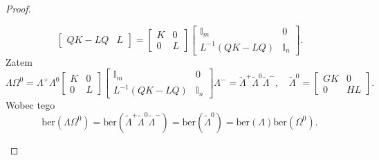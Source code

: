 \documentclass[11pt,a4paper]{report}
\theoremstyle{definition}
\newcommand{\ber}{\mathrm{ber}}
\newcommand{\I}{\mathbb{I}}
\begin{document}
\begin{proof}
\begin{enumerate}[1)]
$$\begin{bmatrix}
		QK - LQ & L 
		\end{bmatrix} = \begin{bmatrix}
		K & 0 \\
		0 & L 
		\end{bmatrix} \begin{bmatrix}
		\I_m & 0 \\
		L^{-1}(QK - LQ) & \I_n 
		\end{bmatrix}\!\!.$$
		Zatem 
		\begin{equation*}
			\Lambda \Omega^0 = \Lambda^+ \Lambda^0 \begin{bmatrix}
			K & 0 \\
			0 & L 
			\end{bmatrix} \begin{bmatrix}
			\I_m & 0 \\
			L^{-1}(QK - LQ) & \I_n 
			\end{bmatrix} \Lambda^- = \tilde{\Lambda}^+ \tilde{\Lambda}^0 \tilde{\Lambda}^-, \quad \tilde{\Lambda}^0 = \begin{bmatrix}
			GK & 0 \\
			0 & HL 
			\end{bmatrix}\!.
		\end{equation*}
		Wobec tego
		\begin{equation*}
			\ber(\Lambda \Omega^0) = \ber \left( \tilde\Lambda^+ \tilde\Lambda^0 \tilde\Lambda^- \right) =  \ber(\tilde\Lambda^0) = \ber(\Lambda) \ber( \Omega^0).
		\end{equation*}
								

\end{enumerate}
\end{proof}
\end{document}
